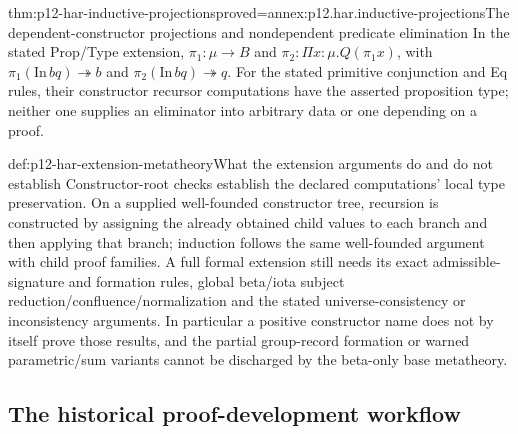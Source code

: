 \begin{hbtheorem}{thm:p12-har-inductive-projections}{proved=annex:p12.har.inductive-projections}{The dependent-constructor projections and nondependent predicate elimination}
In the stated Prop/Type extension,
\(\pi_1:\mu\to B\) and
\(\pi_2:\Pi x:\mu.Q(\pi_1x)\), with
\(\pi_1(\mathrm{In}\,b q)\twoheadrightarrow b\) and
\(\pi_2(\mathrm{In}\,b q)\twoheadrightarrow q\).
For the stated primitive conjunction and Eq rules, their constructor
recursor computations have the asserted proposition type; neither one
supplies an eliminator into arbitrary data or one depending on a proof.
\end{hbtheorem}

\begin{proofboundary}{def:p12-har-extension-metatheory}{What the extension arguments do and do not establish}
Constructor-root checks establish the declared computations' local
type preservation. On a supplied well-founded constructor tree, recursion
is constructed by assigning the already obtained child values to each
branch and then applying that branch; induction follows the same
well-founded argument with child proof families. A full formal extension
still needs its exact admissible-signature and formation rules, global
beta/iota subject reduction/confluence/normalization and the stated
universe-consistency or inconsistency arguments. In particular a positive
constructor name does not by itself prove those results, and the partial
group-record formation or warned parametric/sum variants cannot be
discharged by the beta-only base metatheory.
\end{proofboundary}

\subsection{The historical proof-development workflow}

